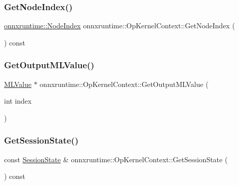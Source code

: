 \subsubsection{\texorpdfstring{Get\+Node\+Index()}{GetNodeIndex()}}
{\footnotesize\ttfamily \mbox{\hyperlink{namespaceonnxruntime_af8773b5c12b5d8fd9292eb2e268df760}{onnxruntime\+::\+Node\+Index}} onnxruntime\+::\+Op\+Kernel\+Context\+::\+Get\+Node\+Index (\begin{DoxyParamCaption}{ }\end{DoxyParamCaption}) const\hspace{0.3cm}{\ttfamily [protected]}}

\mbox{\label{classonnxruntime_1_1OpKernelContext_a762e7a53c262fbade08d571bfbb5ce7d}} 
\subsubsection{\texorpdfstring{Get\+Output\+M\+L\+Value()}{GetOutputMLValue()}}
{\footnotesize\ttfamily \mbox{\hyperlink{classonnxruntime_1_1MLValue}{M\+L\+Value}} $\ast$ onnxruntime\+::\+Op\+Kernel\+Context\+::\+Get\+Output\+M\+L\+Value (\begin{DoxyParamCaption}\item[{int}]{index }\end{DoxyParamCaption})\hspace{0.3cm}{\ttfamily [protected]}}

\mbox{\label{classonnxruntime_1_1OpKernelContext_aa39b5ccbcbed000ba572de3398f38738}} 
\subsubsection{\texorpdfstring{Get\+Session\+State()}{GetSessionState()}}
{\footnotesize\ttfamily const \mbox{\hyperlink{classonnxruntime_1_1SessionState}{Session\+State}} \& onnxruntime\+::\+Op\+Kernel\+Context\+::\+Get\+Session\+State (\begin{DoxyParamCaption}{ }\end{DoxyParamCaption}) const\hspace{0.3cm}{\ttfamily [protected]}}

